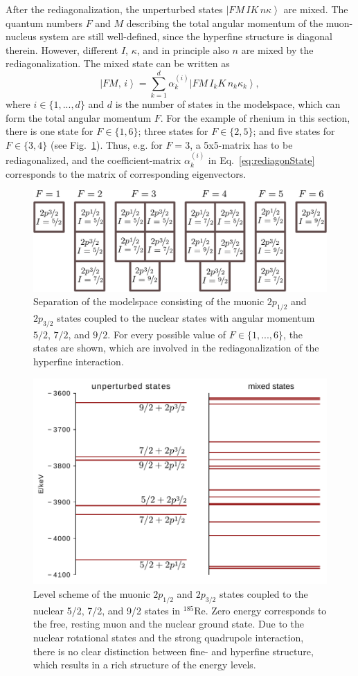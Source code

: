 After the rediagonalization, the unperturbed states $\left|FM\,IK\,n\kappa\right>$ are mixed. The quantum numbers $F$ and $M$ describing the total angular momentum of the muon-nucleus system are still well-defined, since the hyperfine structure is diagonal therein. However, different $I$, $\kappa$, and in principle also $n$ are mixed by the rediagonalization. The mixed state can be written as
\begin{equation}
\label{eq:rediagonState}
\left|FM,\,i\right> = \sum_{k=1}^d \alpha^{(i)}_k \left| FM\,I_kK\,n_k\kappa_k\right>,
\end{equation}
where $i\in \{1,...,d\}$ and $d$ is the number of states in the modelspace, which can form the total angular momentum $F$. For the example of rhenium in this section, there is one state for $F\in \{1,6\}$; three states for $F\in\{2,5\}$; and five states for $F\in\{3,4\}$ (see Fig.~\ref{fig:blockRe}). Thus, e.g. for $F=3$, a 5x5-matrix has to be rediagonalized, and the coefficient-matrix $\alpha^{(i)}_k$ in Eq.~\eqref{eq:rediagonState} corresponds to the matrix of corresponding eigenvectors.
%
\begin{figure}%
\centering
\includegraphics[width=0.91\linewidth]{pics/blocksRe.pdf}%
\caption{Separation of the modelspace consisting of the muonic $2p_{1/2}$ and $2p_{3/2}$ states coupled to the nuclear states with angular momentum $5/2$, $7/2$, and $9/2$. For every possible value of $F\in \{1,...,6\}$, the states are shown, which are involved in the rediagonalization of the hyperfine interaction.}%
\label{fig:blockRe}%
\end{figure}
%
%
\begin{figure}%
\centering
\includegraphics[width=0.75\linewidth]{pics/quad2.pdf}%
\caption{Level scheme of the muonic $2p_{1/2}$ and $2p_{3/2}$ states coupled to the nuclear 5/2, 7/2, and 9/2  states in $^{185}$Re. Zero energy corresponds to the free, resting muon and the nuclear ground state. Due to the nuclear rotational states and the strong quadrupole interaction, there is no clear distinction between fine- and hyperfine structure, which results in a rich structure of the energy levels.}%
\label{fig:quad2}%
\end{figure}
